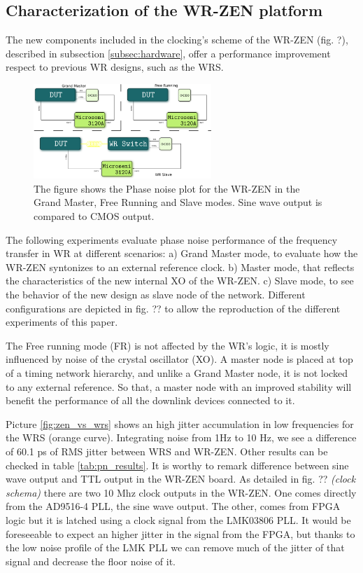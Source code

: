 \subsection{Characterization of the WR-ZEN platform}
\label{subsec: charact_zen}


The new components included in the clocking's scheme of the WR-ZEN (fig. ?), described in subsection \ref{subsec:hardware}, offer a performance improvement respect to previous WR designs, such as the WRS. 

\begin{figure}[H]
    \centering
    \includegraphics[width=0.6\textwidth]{img/pn_setup.png}
    \caption{The figure shows the Phase noise plot for the WR-ZEN in the Grand Master, Free Running and Slave modes. Sine wave output is compared to CMOS output.}
    \label{fig:pn_setup}
\end{figure}

The following experiments evaluate phase noise performance of the frequency transfer in WR at different scenarios: a) Grand Master mode, to evaluate how the WR-ZEN syntonizes to an external reference clock. b) Master mode, that reflects the characteristics of the new internal XO of the WR-ZEN. c) Slave mode, to see the behavior of the new design as slave node of the network. Different configurations are depicted in fig. ?? to allow the reproduction of the different experiments of this paper.

The Free running mode (FR) is not affected by the WR's logic, it is mostly influenced by noise of the crystal oscillator (XO). A master node is placed at top of a timing network hierarchy, and unlike a Grand Master node, it is not locked to any external reference. So that, a master node with an improved stability will benefit the performance of all the downlink devices connected to it.

Picture \ref{fig:zen_vs_wrs} shows an high jitter accumulation in low frequencies for the WRS (orange curve). Integrating noise from 1Hz to 10 Hz, we see a difference of 60.1 ps of RMS jitter between WRS and WR-ZEN. Other results can be checked in table \ref{tab:pn_results}. It is worthy to remark difference between sine wave output and TTL output in the WR-ZEN board. As detailed in fig. ?? \textit{(clock schema)} there are two 10 Mhz clock outputs in the WR-ZEN. One comes directly from the AD9516-4 PLL, the sine wave output. The other, comes from FPGA logic but it is latched using a clock signal from the LMK03806 PLL. It would be foreseeable to expect an higher jitter in the signal from the FPGA, but thanks to the low noise profile of the LMK PLL we can remove much of the jitter of that signal and decrease the floor noise of it.

